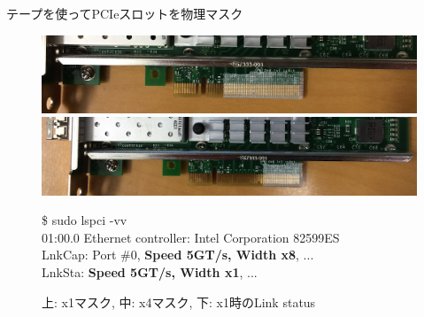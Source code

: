 \documentclass[10pt, compress]{beamer}
\begin{document}

\begin{frame}{テープを使ってPCIeスロットを物理マスク}

\begin{figure}
\includegraphics[width=.9\textwidth]{pic/x1.png} \\
\includegraphics[width=.9\textwidth]{pic/x4.png}

\begin{scriptsize}
\begin{tcolorbox}[width=.9\linewidth]
\$ sudo lspci -vv\\
01:00.0 Ethernet controller: Intel Corporation 82599ES\\
LnkCap: Port \#0, \textbf{Speed 5GT/s, Width x8}, ... \\
LnkSta: \textbf{Speed 5GT/s, Width x1}, ...
\end{tcolorbox}
\end{scriptsize}
\vspace{-.5em}
\small{上: x1マスク, 中: x4マスク, 下: x1時のLink status}
\end{figure}

\end{frame}

\end{document}
